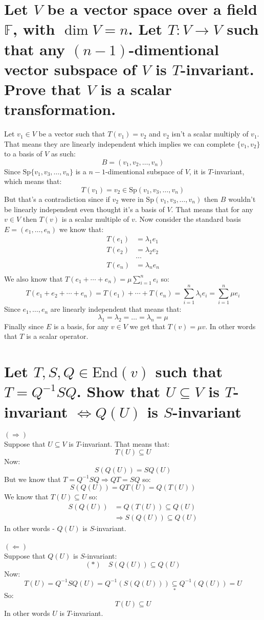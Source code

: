 \documentclass[11pt,a4paper]{article}
\theoremstyle{plain}
\newcommand{\Sp}{\text{Sp}}
\newcommand{\F}{\mathbb{F}}
\begin{document}
	\section{Let $V$ be a vector space over a field $\F$, with $\dim V = n$. 
	Let $T \colon V \to V$ such that any $(n-1)$-dimentional vector subspace of 
	$V$ is $T$-invariant. Prove that $V$ is a scalar transformation.}
	Let $v_1\in V$ be a vector such that $T(v_1) = v_2$ and $v_2$ isn't a
	scalar multiply of $v_1$. That means they are linearly independent which
	implies we can complete $\{v_1,v_2\}$ to a basis of $V$ as such:
	\[
		B = (v_1,v_2,\dots,v_n)
	\] 
	Since $\Sp\{v_1,v_3,\dots,v_n\}$ is a $n-1$-dimentional subspace of $V$,
	it is $T$-invariant, which means that:
	\[
		T(v_1) = v_2 \in \Sp(v_1,v_3,\dots,v_n)
	\]
	But that's a contradiction since if $v_2$ were in $\Sp(v_1,v_3,\dots,v_n)$
	then $B$ wouldn't be linearly independent even thought it's a basis of $V$.
	That means that for any $v\in V$ then $T(v)$ is a scalar multiple of $v$.
	Now consider the standard basis $E=(e_1,\dots,e_n)$ we know that:
	\begin{align*} 
		T(e_1) &= \lambda_1e_1 \\
		T(e_2) &= \lambda_2e_2 \\
		&\dots \\
		T(e_n) &= \lambda_ne_n \\
	\end{align*}
	We also know that $T(e_1+\cdots+e_n) = \mu\sum_{i=1}^{n}{e_i}$ so:
	\[
		T(e_1+e_2+\cdots+e_n) = T(e_1) + \cdots + T(e_n) = 
		\sum_{i=1}^{n}{\lambda_ie_i} = \sum_{i=1}^{n}{\mu e_i}
	\]
	Since $e_1,\dots,e_n$ are linearly independent that means that:
	\[
		\lambda_1=\lambda_2=\dots=\lambda_n=\mu
	\]
	Finally since $E$ is a basis, for any $v\in V$ we get that $T(v) = \mu v$.
	In other words that $T$ is a scalar operator.
	
	\newpage
	
	\section{Let $T,S,Q\in\text{End}(v)$ such that $T = Q^{-1}SQ$. 
	Show that $U\subseteq V$ is $T$-invariant $\iff Q(U)$ is $S$-invariant}
	\underline{$(\Rightarrow)$} \\ Suppose that $U\subseteq V$ is $T$-invariant.
	That means that:
	\[
		T(U)\subseteq U
	\]
	Now:
	\[
		S(Q(U)) = SQ(U)
	\]
	But we know that $T = Q^{-1}SQ \Rightarrow QT = SQ$ so:
	\[
		S(Q(U)) = QT(U) = Q(T(U))
	\]
	We know that $T(U)\subseteq U$ so:
	\begin{align*}
		S(Q(U)) &= Q(T(U)) \subseteq Q(U) \\
		&\Rightarrow S(Q(U)) \subseteq Q(U)
	\end{align*}
	In other words - $Q(U)$ is $S$-invariant. \\\\
	\underline{$(\Leftarrow)$} \\ Suppose that $Q(U)$ is $S$-invariant:
	\[
		(*) \quad S(Q(U)) \subseteq Q(U)
	\]
	Now:
	\[
		T(U) = Q^{-1}SQ(U) = Q^{-1}(S(Q(U))) \underset{*}{\subseteq} 
		Q^{-1}(Q(U)) = U
	\]
	So:
	\[
		T(U) \subseteq U
	\]
	In other words $U$ is $T$-invariant.
	
\end{document}
